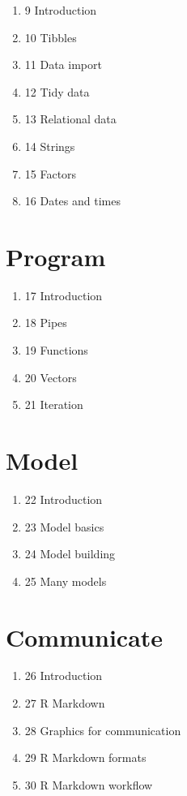 \documentclass[
]{book}
\providecommand{\tightlist}{%
  \setlength{\itemsep}{0pt}\setlength{\parskip}{0pt}}
\theoremstyle{definition}
\theoremstyle{definition}
\theoremstyle{definition}
\theoremstyle{definition}
\theoremstyle{remark}
\begin{document}
\begin{enumerate}
\def\labelenumi{\alph{enumi})}
\tightlist
\item
  9 Introduction
\item
  10 Tibbles
\item
  11 Data import
\item
  12 Tidy data
\item
  13 Relational data
\item
  14 Strings
\item
  15 Factors
\item
  16 Dates and times
\end{enumerate}

\hypertarget{program}{%
\section{Program}\label{program}}

\begin{enumerate}
\def\labelenumi{\alph{enumi})}
\tightlist
\item
  17 Introduction
\item
  18 Pipes
\item
  19 Functions
\item
  20 Vectors
\item
  21 Iteration
\end{enumerate}

\hypertarget{model}{%
\section{Model}\label{model}}

\begin{enumerate}
\def\labelenumi{\alph{enumi})}
\tightlist
\item
  22 Introduction
\item
  23 Model basics
\item
  24 Model building
\item
  25 Many models
\end{enumerate}

\hypertarget{communicate}{%
\section{Communicate}\label{communicate}}

\begin{enumerate}
\def\labelenumi{\alph{enumi})}
\tightlist
\item
  26 Introduction
\item
  27 R Markdown
\item
  28 Graphics for communication
\item
  29 R Markdown formats
\item
  30 R Markdown workflow
\end{enumerate}
\end{document}
